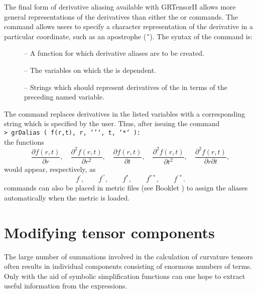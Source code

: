 \documentclass{article}
\begin{document}
{{{The final form of derivative aliasing available with GRTensorII allows more
general representations of the derivatives than either the 
 or  commands. The 
command allows users to specify a character representation of the derivative
in a particular coordinate, such as an apostrophe (\texttt{'}). The syntax
of the command is:\\
%
\begin{cmdspec}
  \label{spec:grDalias}

  \begin{description}
    \item[] -- A function for which derivative aliases are
      to be created.
    \item[] -- The variables on which the 
      is dependent.
    \item[] -- Strings which should represent derivatives of
      the  in terms of the preceding named variable.
  \end{description}

\end{cmdspec}

The  command replaces derivatives in the listed variables
with a corresponding string which is specified by the user. Thus, after
issuing the command\\

\noindent\texttt{> grDalias ( f(r,t), r, `'`, t, `*` ):}\\

\noindent the functions
\[
  \frac{\partial f(r,t)}{\partial r}, \quad 
  \frac{\partial^2 f(r,t)}{\partial r^2}, \quad
  \frac{\partial f(r,t)}{\partial t}, \quad
  \frac{\partial^2 f(r,t)}{\partial t^2}, \quad
  \frac{\partial^2 f(r,t)}{\partial r \partial t},
\]
would appear, respectively, as
\[
  f^\prime, \qquad f^{\prime\prime}, \qquad f^*, \qquad f^{**}, \qquad
    f^{\prime *}.
\]
 commands can also be placed in metric files (see
Booklet \grMakegRef) to assign the aliases automatically when the
metric is loaded.
%
\section{Modifying tensor components} \label{sec:gralter}
%
The large number of summations involved in the calculation of
curvature tensors often results in individual components consisting of
enormous numbers of terms. Only with the aid of symbolic
simplification functions can one hope to extract useful information
from the expressions.

}}}
\end{document}
